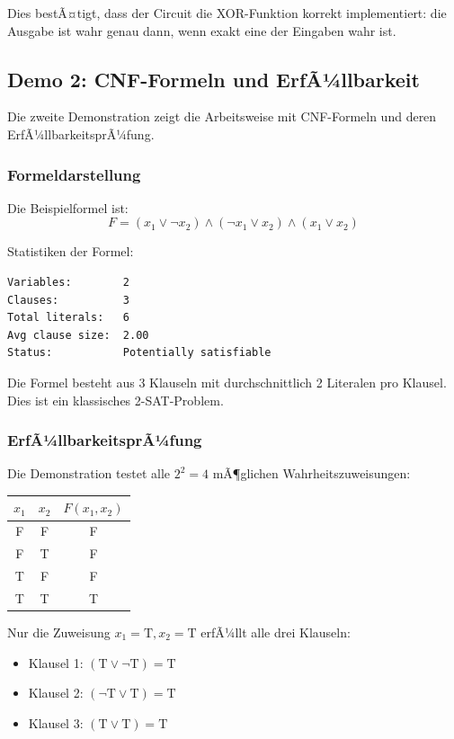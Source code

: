 ﻿\documentclass[a4paper,12pt]{article}
\theoremstyle{definition}
\begin{document}
Dies bestÃ¤tigt, dass der Circuit die XOR-Funktion korrekt implementiert: die Ausgabe ist wahr genau dann, wenn exakt eine der Eingaben wahr ist.

\subsection{Demo 2: CNF-Formeln und ErfÃ¼llbarkeit}

Die zweite Demonstration zeigt die Arbeitsweise mit CNF-Formeln und deren ErfÃ¼llbarkeits\-prÃ¼fung.

\subsubsection{Formeldarstellung}

Die Beispielformel ist:
\[
F = (x_1 \lor \neg x_2) \land (\neg x_1 \lor x_2) \land (x_1 \lor x_2)
\]

Statistiken der Formel:
\begin{lstlisting}
Variables:        2
Clauses:          3
Total literals:   6
Avg clause size:  2.00
Status:           Potentially satisfiable
\end{lstlisting}

Die Formel besteht aus 3 Klauseln mit durchschnittlich 2 Literalen pro Klausel. Dies ist ein klassisches 2-SAT-Problem.

\subsubsection{ErfÃ¼llbarkeitsprÃ¼fung}

Die Demonstration testet alle $2^2 = 4$ mÃ¶glichen Wahrheitszuweisungen:

\begin{center}
\begin{tabular}{cc|c}
$x_1$ & $x_2$ & $F(x_1, x_2)$ \\
\hline
F & F & F \\
F & T & F \\
T & F & F \\
T & T & T
\end{tabular}
\end{center}

Nur die Zuweisung $x_1 = \text{T}, x_2 = \text{T}$ erfÃ¼llt alle drei Klauseln:
\begin{itemize}
    \item Klausel 1: $(\text{T} \lor \neg \text{T}) = \text{T}$ \checkmark
    \item Klausel 2: $(\neg \text{T} \lor \text{T}) = \text{T}$ \checkmark
    \item Klausel 3: $(\text{T} \lor \text{T}) = \text{T}$ \checkmark
\end{itemize}
\end{document}
